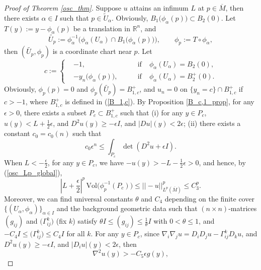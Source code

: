 \documentclass[12pt]{amsart}
\theoremstyle{definition}
\theoremstyle{remark}
\numberwithin{equation}{section}
\begin{document}
\begin{proof}[Proof of Theorem \ref{osc_thm}]
	Suppose $u$ attains an infimum $L$ at $p\in \overline{M}$, then there exists $\alpha \in I$ such that $p \in \tilde{U}_\alpha$.
	Obviously, $B_1\big(\phi_\alpha(p)\big) \subset B_2(0)$.
	Let $T (y) := y - \phi_\alpha (p)$ be a translation in $\mathbb{R}^n$, 
	and $$\tilde{U_p} := \phi_\alpha^{-1} \Big(\phi_\alpha(U_\alpha) \cap B_1\big(\phi_\alpha(p)\big)\Big), \qquad \phi_p := T\circ\phi_\alpha,$$
	then $(\tilde{U_p}, \phi_p)$ is a coordinate chart near $p$. 
	Let 
	\begin{equation}
	c:=\left\{
	\begin{aligned}
	&-1, \qquad &\text{if}\;& \phi_\alpha(U_\alpha) = B_2(0),\\
	&- y_n \big(\phi_\alpha (p)\big), \qquad &\text{if}\;& \phi_\alpha(U_\alpha) = B^+_2(0).
	\end{aligned}\right.
	\end{equation}
	Obviously, $\phi_p (p) = 0$ and $\phi_p (\tilde{U_p}) = B_{1,c}^+$, and $u_n = 0$ on $\{y_n = c\} \cap B_{1,c}^+$ if $c > -1$, where $B_{1,c}^+$ is defined in (\ref{B_1,c}). By Proposition \ref{B_c,1_prop}, for any $\epsilon > 0$, there exists a subset $P_c \subset B_{1,c}^+$ such that (i) for any $y \in P_c$, $u(y) < L + \frac{1}{2}\epsilon$, and $D^2 u(y) \geq - \epsilon I$, and $|Du|(y) < 2\epsilon$; (ii) there exists a constant $c_0 = c_0(n)$ such that
	\begin{equation}\label{P_c_ineq_2}
	c_0 \epsilon^n \leq \int_{P_c} \det (D^2 u + \epsilon I).
	\end{equation}
	When $L < - \frac{\epsilon}{2}$, for any $y \in P_c$, we have $-u(y) > - L - \frac{1}{2}\epsilon > 0$, and hence, by (\ref{osc_Lp_global}),
	\begin{equation}\label{vol_up_bd}
	\left|L + \frac{\epsilon}{2}\right|^p \, \text{Vol}\big(\phi_p^{-1}(P_c)\big) \leq ||-u||^p_{L^p(\overline{M})} \leq C_3^p.
	\end{equation}
	Moreover, we can find universal constants $\theta$ and $C_4$ depending on the finite cover $\{(U_\alpha, \phi_\alpha)\}_{\alpha\in I}$ and the background geometric data such that $(n\times n)$-matrices $(g_{ij})$ and $\big(\Gamma_{ij}^k\big)$ (fix $k$) satisfy $\theta I \leq (g_{ij}) \leq \frac{1}{\theta}I$ with $0 < \theta \leq 1$, and $- C_4 I \leq \big(\Gamma_{ij}^k\big) \leq C_4 I$ for all $k$. For any $y \in P_c$, since $\nabla_i\nabla_j u = D_i D_j u - \Gamma_{ij}^k D_k u$, and $D^2 u(y) \geq - \epsilon I$, and $|D_i u|(y) < 2\epsilon$, then
	\begin{equation}\label{osc_ineq_1}
	\nabla^2 u (y) > - C_5\epsilon g (y),

\end{equation}
\end{proof}
\end{document}
